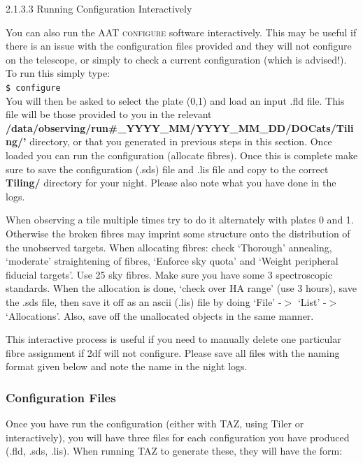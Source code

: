 \documentclass[12pt]{article}
\begin{document}
\textsf{2.1.3.3 Running Configuration Interactively}
\vspace{2mm}

You can also run the AAT \textsc{configure} software interactively. This may be useful if there is an issue with the configuration files provided and they will not configure on the telescope, or simply to check a current configuration (which is advised!). To run this simply type:\\

\hspace{15mm} \texttt{\$ configure}\\

You will then be asked to select the plate (0,1) and load an input .fld file. This file will be those provided to you in the relevant \textbf{/data/observing/run\#\_YYYY\_MM/YYYY\_MM\_DD/DOCats/Tiling/'} directory, or that you generated in previous steps in this section. Once loaded you can run the configuration (allocate fibres). Once this is complete make sure to save the configuration (.sds) file and .lis file and copy to the correct \textbf{Tiling/} directory for your night. Please also note what you have done in the logs. 

When observing a tile multiple times try to do it alternately with plates 0 and 1. Otherwise the broken fibres may imprint some structure onto the distribution of the unobserved targets. When allocating fibres: check `Thorough' annealing, `moderate' straightening of fibres, `Enforce sky quota' and `Weight peripheral fiducial targets'. Use 25 sky fibres. Make sure you have some 3 spectroscopic standards. When the allocation is done, `check over HA range' (use 3 hours), save the .sds file, then save it off as an ascii (.lis) file by doing `File' -$>$ `List' -$>$ `Allocations'. Also, save off the unallocated objects in the same manner. 

This interactive process is useful if you need to manually delete one particular fibre assignment if 2df will not configure. Please save all files with the naming format given below and note the name in the night logs.       


\subsubsection{Configuration Files}
\label{sec:config}


Once you have run the configuration (either with TAZ, using Tiler or interactively), you will have three files for each configuration you have produced (.fld, .sds, .lis). When running TAZ to generate these, they will have the form: \\
\end{document}
